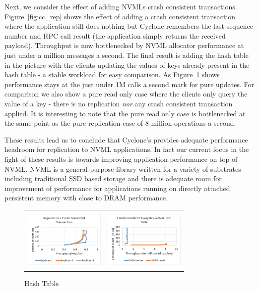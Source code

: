 \documentclass[letterpaper,twocolumn,10pt]{article}
\begin{document}
Next, we consider the effect of adding NVMLs crash consistent
transactions. Figure~\ref{fig:cc_rep} shows the effect of adding a crash
consistent transaction where the application still does nothing but Cyclone
remembers the last sequence number and RPC call result (the application simply
returns the received payload). Throughput is now bottlenecked by NVML allocator
performance at just under a million messages a second. The final result is
adding the hash table in the picture with the clients updating the values of
keys already present in the hash table - a stable workload for easy
comparison. As Figure~\ref{fig:app_rep} shows performance stays at the just
under 1M calls a second mark for pure updates. For comparison we also show a
pure read only case where the clients only query the value of a key - there is
no replication \emph{nor} any crash consistent transaction applied. It is
interesting to note that the pure read only case is bottlenecked at the same
point as the pure replication case of 8 million operations a second.

These results lead us to conclude that Cyclone's provides adequate performance
headroom for replication to NVML applications. In fact our current focus in the
light of these results is towards improving application performance on top of
NVML. NVML is a general purpose library written for a variety of substrates
including traditional SSD based storage and there is adequate room for
improvement of performance for applications running on directly attached
persistent memory with close to DRAM performance.

\begin{figure}
\begin{tabular}{cc}
\begin{minipage}{0.25\textwidth}
  \hspace{-0.17in}
  \includegraphics[width=\textwidth,height=3cm]{results/cc_mops.pdf}
  \caption{Crash Consistency}
  \label{fig:cc_rep}
\end{minipage} &
  \hspace{-0.37in}
\begin{minipage}{0.25\textwidth}
  \includegraphics[width=\textwidth,height=3cm]{results/app_mops.pdf}
  \caption{Hash Table}
  \label{fig:app_rep}
\end{minipage}
\end{tabular}
\end{figure}
\end{document}
